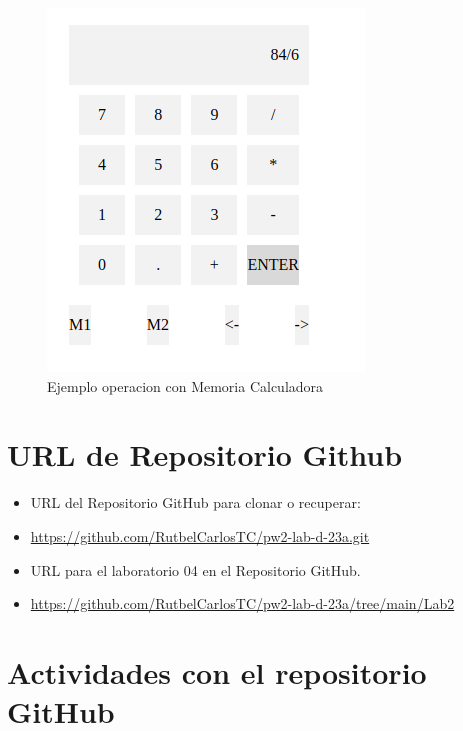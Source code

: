 \documentclass{article}
\begin{document}
	\begin{figure}[H]
	    \centering
	    \includegraphics[scale=0.5]{img/exe/Ejemplo2-operacion-Con memoria M2.png}
	    \caption{Ejemplo operacion con Memoria Calculadora}
	\end{figure}

\section{URL de Repositorio Github}
\begin{itemize}
	\item URL del Repositorio GitHub para clonar o recuperar:
	\item \url{https://github.com/RutbelCarlosTC/pw2-lab-d-23a.git}
	\item URL para el laboratorio 04 en el Repositorio GitHub.
	\item \url{https://github.com/RutbelCarlosTC/pw2-lab-d-23a/tree/main/Lab2}
\end{itemize}

\section{Actividades con el repositorio GitHub}
\end{document}
